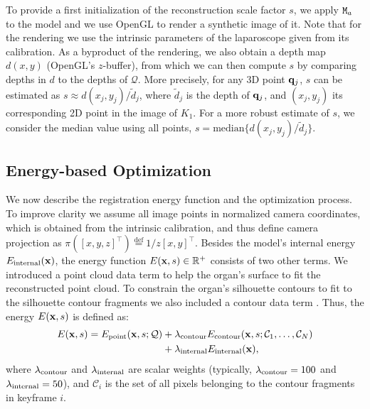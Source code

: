 To provide a first initialization of the reconstruction scale factor $s$, we apply $\mat{M}_a$ to the model and we use OpenGL to render a synthetic image of it.
Note that for the rendering we use the intrinsic parameters of the laparoscope given from its calibration.
As a byproduct of the rendering, we also obtain a depth map $d(x,y)$ (OpenGL's $z$-buffer), from which we can then compute $s$ by comparing depths in $d$ to the depths of $\mathcal{Q}$.
More precisely, for any 3D point $\mathbf{q}_j$, $s$ can be estimated as $s\approx d(x_j,y_j)/\tilde{d}_j$, where $\tilde{d}_j$ is the depth of $\mathbf{q}_j$, and $(x_j,y_j)$ its corresponding 2D point in the image of $K_1$.
For a more robust estimate of $s$, we consider the median value using all points, \ie $s=\mathrm{median} \{d(x_j,y_j)/\tilde{d}_j\}$. 


\subsection{Energy-based Optimization}
\label{sec:enOpt}
We now describe the registration energy function and the optimization process. To improve clarity we assume all image points in normalized camera coordinates, which is obtained from the intrinsic calibration, and thus define camera projection as
$\pi(\left[x,y,z\right]^{\top})\overset{\mathrm{def}}{=}1/z \left[x,y\right]^{\top}$. 
Besides the model's internal energy $E_{\text{internal}}(\mathbf{x})$, the energy function $E(\mathbf{x},s)\in\mathbb{R}^+$ consists of two other terms.
We introduced a point cloud data term \Epoint to help the organ's surface to fit the reconstructed point cloud.
To constrain the organ's silhouette contours to fit to the silhouette contour fragments we also included a contour data term \Econtour. 
Thus, the energy $E(\mathbf{x},s)$ is defined as:
\begin{equation}
\label{eq:totalCost}
\begin{split}
E(\vet{x},s)=\Epoint(\vet{x},s;\mathcal{Q}) & + \lambdaContour\Econtour(\vet{x},s;\mathcal{C}_{1},\dots ,\mathcal{C}_{N})\\
& +\lambdaInternal\Einternal(\vet{x}),
\end{split}
\end{equation}
\noindent where $\lambda_{\text{contour}}$ and $\lambda_{\text{internal}}$ are scalar weights (typically, $\lambda_{\text{contour}}=100$ and $\lambda_{\text{internal}}=50$), and $\mathcal{C}_i$ is the set of all pixels belonging to the contour fragments in keyframe $i$.

